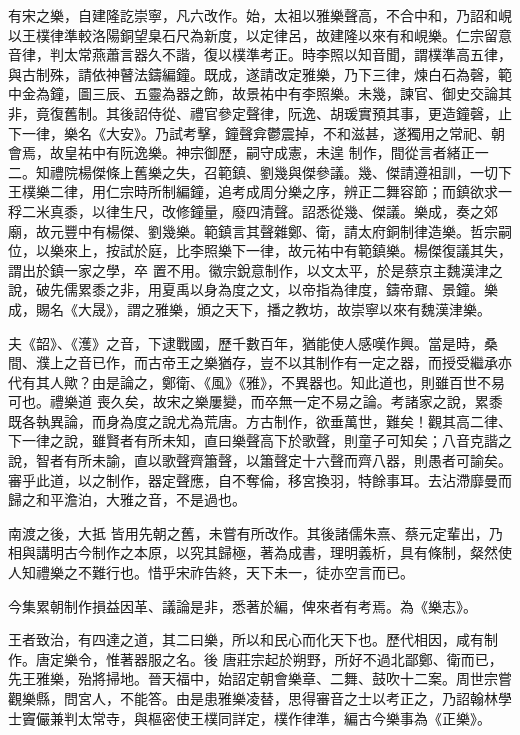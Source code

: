 
\begin{pinyinscope}

 有宋之樂，自建隆訖崇寧，凡六改作。始，太祖以雅樂聲高，不合中和，乃詔和峴以王樸律準較洛陽銅望臬石尺為新度，以定律呂，故建隆以來有和峴樂。仁宗留意
 音律，判太常燕蕭言器久不諧，復以樸準考正。時李照以知音聞，謂樸準高五律，與古制殊，請依神瞽法鑄編鐘。既成，遂請改定雅樂，乃下三律，煉白石為磬，範中金為鐘，圖三辰、五靈為器之飾，故景祐中有李照樂。未幾，諫官、御史交論其非，竟復舊制。其後詔侍從、禮官參定聲律，阮逸、胡瑗實預其事，更造鐘磬，止下一律，樂名《大安》。乃試考擊，鐘聲弇鬱震掉，不和滋甚，遂獨用之常祀、朝會焉，故皇祐中有阮逸樂。神宗御歷，嗣守成憲，未遑
 制作，間從言者緒正一二。知禮院楊傑條上舊樂之失，召範鎮、劉幾與傑參議。幾、傑請遵祖訓，一切下王樸樂二律，用仁宗時所制編鐘，追考成周分樂之序，辨正二舞容節；而鎮欲求一稃二米真黍，以律生尺，改修鐘量，廢四清聲。詔悉從幾、傑議。樂成，奏之郊廟，故元豐中有楊傑、劉幾樂。範鎮言其聲雜鄭、衛，請太府銅制律造樂。哲宗嗣位，以樂來上，按試於庭，比李照樂下一律，故元祐中有範鎮樂。楊傑復議其失，謂出於鎮一家之學，卒
 置不用。徽宗銳意制作，以文太平，於是蔡京主魏漢津之說，破先儒累黍之非，用夏禹以身為度之文，以帝指為律度，鑄帝鼐、景鐘。樂成，賜名《大晟》，謂之雅樂，頒之天下，播之教坊，故崇寧以來有魏漢津樂。



 夫《韶》、《濩》之音，下逮戰國，歷千數百年，猶能使人感嘆作興。當是時，桑間、濮上之音已作，而古帝王之樂猶存，豈不以其制作有一定之器，而授受繼承亦代有其人歟？由是論之，鄭衛、《風》《雅》，不異器也。知此道也，則雖百世不易可也。禮樂道
 喪久矣，故宋之樂屢變，而卒無一定不易之論。考諸家之說，累黍既各執異論，而身為度之說尤為荒唐。方古制作，欲垂萬世，難矣！觀其高二律、下一律之說，雖賢者有所未知，直曰樂聲高下於歌聲，則童子可知矣；八音克諧之說，智者有所未諭，直以歌聲齊簫聲，以簫聲定十六聲而齊八器，則愚者可諭矣。審乎此道，以之制作，器定聲應，自不奪倫，移宮換羽，特餘事耳。去沾滯靡曼而歸之和平澹泊，大雅之音，不是過也。



 南渡之後，大抵
 皆用先朝之舊，未嘗有所改作。其後諸儒朱熹、蔡元定輩出，乃相與講明古今制作之本原，以究其歸極，著為成書，理明義析，具有條制，粲然使人知禮樂之不難行也。惜乎宋祚告終，天下未一，徒亦空言而已。



 今集累朝制作損益因革、議論是非，悉著於編，俾來者有考焉。為《樂志》。



 王者致治，有四達之道，其二曰樂，所以和民心而化天下也。歷代相因，咸有制作。唐定樂令，惟著器服之名。後
 唐莊宗起於朔野，所好不過北鄙鄭、衛而已，先王雅樂，殆將掃地。晉天福中，始詔定朝會樂章、二舞、鼓吹十二案。周世宗嘗觀樂縣，問宮人，不能答。由是患雅樂凌替，思得審音之士以考正之，乃詔翰林學士竇儼兼判太常寺，與樞密使王樸同詳定，樸作律準，編古今樂事為《正樂》。




\end{pinyinscope}
